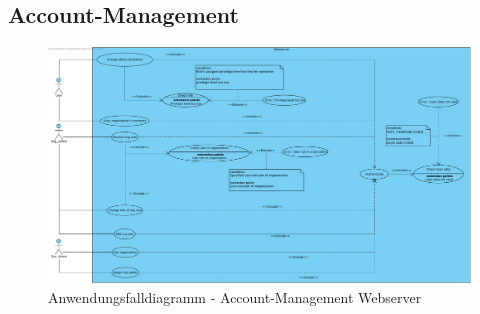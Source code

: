 \subsection{Account-Management}

\begin{figure}[h]
	\centering
	\includegraphics[width=\linewidth]{img/diagrams/Acc_Management_Web.pdf}
	\caption{Anwendungsfalldiagramm - Account-Management Webserver}
	\label{fig:anwendungsfalldiagramm-acc}
\end{figure}

\newpage

